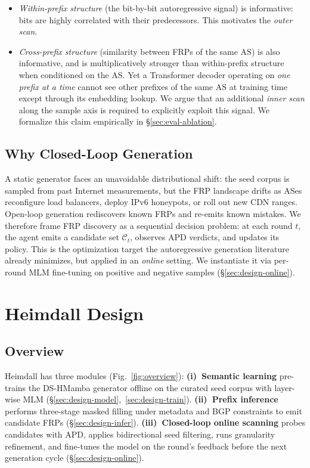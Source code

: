 \documentclass[conference]{IEEEtran}
\begin{document}
\begin{itemize}
\item \emph{Within-prefix structure} (the bit-by-bit autoregressive
      signal) is informative: bits are highly correlated with their
      predecessors.  This motivates the \emph{outer scan}.
\item \emph{Cross-prefix structure} (similarity between FRPs of the
      same AS) is also informative, and is multiplicatively stronger
      than within-prefix structure when conditioned on the AS.  Yet a
      Transformer decoder operating on \emph{one prefix at a time}
      cannot see other prefixes of the same AS at training time except
      through its embedding lookup.  We argue that an additional
      \emph{inner scan} along the sample axis is required to
      explicitly exploit this signal.  We formalize this claim
      empirically in \S\ref{sec:eval-ablation}.
\end{itemize}

\subsection{Why Closed-Loop Generation}
A static generator faces an unavoidable distributional shift: the seed
corpus is sampled from past Internet measurements, but the FRP
landscape drifts as ASes reconfigure load balancers, deploy IPv6
honeypots, or roll out new CDN ranges.  Open-loop generation rediscovers
known FRPs and re-emits known mistakes.  We therefore frame FRP
discovery as a sequential decision problem: at each round $t$, the
agent emits a candidate set $\mathcal C_t$, observes APD verdicts, and
updates its policy.  This is the optimization target the autoregressive
generation literature already minimizes, but applied in an
\emph{online} setting.  We instantiate it via per-round MLM fine-tuning
on positive and negative samples (\S\ref{sec:design-online}).

\section{Heimdall Design}\label{sec:design}

\subsection{Overview}
Heimdall has three modules (Fig.~\ref{fig:overview}):
\textbf{(i)~Semantic learning} pre-trains the DS-HMamba generator
offline on the curated seed corpus with layer-wise MLM
(\S\ref{sec:design-model},~\ref{sec:design-train}).
\textbf{(ii)~Prefix inference} performs three-stage masked filling
under metadata and BGP constraints to emit candidate FRPs
(\S\ref{sec:design-infer}).
\textbf{(iii)~Closed-loop online scanning} probes candidates with APD,
applies bidirectional seed filtering, runs granularity refinement, and
fine-tunes the model on the round's feedback before the next
generation cycle (\S\ref{sec:design-online}).
\end{document}
